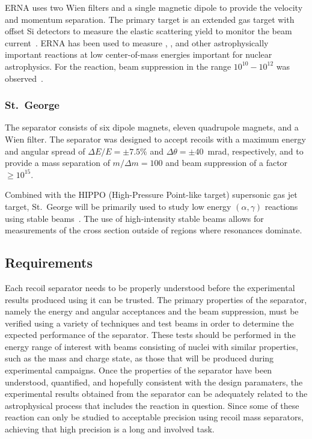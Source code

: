 ERNA uses two Wien filters and a single magnetic dipole to provide the velocity
and momentum separation. The primary target is an extended gas target with
offset Si detectors to measure the elastic scattering yield to monitor the
beam current~\cite{DiLeva2008}. ERNA has been used to measure
,
, and other astrophysically
important reactions at low
center-of-mass energies important for nuclear astrophysics. For the
 reaction, beam suppression
in the range $10^{10} - 10^{12}$ was observed~\cite{DiLeva2008}.

\subsubsection{St.\ George}
The separator consists of six dipole magnets, eleven quadrupole magnets, and a
Wien filter. The separator was designed to accept recoils with a maximum
energy and angular spread of $\Delta E/E = \pm7.5\%$ and
$\Delta\theta = \pm40$~mrad, respectively, and to provide a mass separation
of $m/\Delta m = 100$ and beam suppression of a factor $\geq 10^{15}$.

Combined with the HIPPO (High-Pressure Point-like target) supersonic gas jet
target, St.\ George will be primarily used to study low energy
$(\alpha,\gamma)$ reactions using stable beams~\cite{Kontos2012}. The use of
high-intensity stable beams allows for measurements of the cross section
outside of regions where resonances dominate.

\subsection{Requirements}

Each recoil separator needs to be properly understood before the experimental
results produced using it can be trusted. The primary properties of the
separator, namely the energy and angular acceptances and the beam suppression,
must be verified using a variety of techniques and test beams in order to
determine the expected performance of the separator. These tests should be
performed in the energy range of interest with beams consisting of nuclei with
similar properties, such as the mass and charge state, as those that will be
produced during experimental campaigns. Once the properties of the separator
have been understood, quantified, and hopefully consistent with the design
paramaters, the experimental results obtained from the separator can be
adequately related to the astrophysical process that includes the reaction in
question. Since some of these reaction can only be studied to acceptable
precision using recoil mass separators, achieving that high precision is a
long and involved task.

